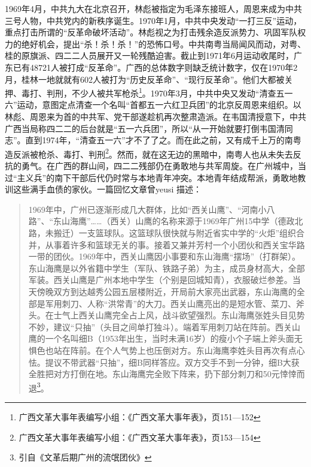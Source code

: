 1969年4月，中共九大在北京召开，林彪被指定为毛泽东接班人，周恩来成为中共三号人物，中共党内的新秩序诞生。1970年1月，中共中央发动“一打三反”运动，重点打击所谓的“反革命破坏活动”。林彪视之为打击残余造反派势力、巩固军队权力的绝好机会，提出“杀！杀！杀！”的恐怖口号。中共南粤当局闻风而动，对粤、桂的原旗派、四二二人员展开又一轮残酷迫害。截止到1971年6月运动收尾时，广东已有48721人被打成“反革命”。广西的总体数字则缺乏统计数字，仅在1970年2月，桂林一地就就有602人被打为“历史反革命”、“现行反革命”。他们大都被关押、毒打、判刑，不少人被共军枪杀\footnote{广西文革大事年表编写小组：《广西文革大事年表》，页151—152}。1970年3月，中共中央又发动“清查五一六”运动，意图定点清查一个名叫“首都五一六红卫兵团”的北京反周恩来组织。以林彪、周恩来为首的中共军、党干部遂趁机再次整肃造派。在韦国清授意下，中共广西当局称四二二的后台就是“五一六兵团”，所以“从一开始就要打倒韦国清同志”。直到1974年，“清查五一六”才不了了之。而在此之前，又有成千上万的南粤造反派被枪杀、毒打、判刑\footnote{广西文革大事年表编写小组：《广西文革大事年表》，页153—154}。然而，就在这无边的黑暗中，南粤人也从未失去反抗的勇气。在广西的群山间，四二二残部仍在勇敢地与共军周旋。在广州城中，当过“主义兵”的南下干部后代仍时常与本地青年冲突。本地青年结成帮派，勇敢地教训这些满手血债的家伙。一篇回忆文章曾yeusi 描述：

\begin{quote}

1969年中，广州已逐渐形成几大群体，比如“西关山鹰”、“河南小八路”、“东山海鹰”……（西关）山鹰的名称来源于1969年广州15中学（德政北路，未搬迁）一支篮球队。这篮球队很快就与附近省实中学的“火炬”组织合并，从事着许多和篮球无关的事。接着又兼并芳村一个小团伙和西关宝华路一带的团伙。1969年中，西关山鹰因小事要和东山海鹰“摆场”（打群架）。东山海鹰是以外省籍中学生（军队、铁路子弟）为主，成员身材高大，全部军装。西关山鹰是广州本地中学生（个别是回城知青），衣服破烂参差。当天傍晚双方到达越秀公园五层楼附近，开局前大家亮出武器，东山海鹰的全部是军用刺刀、人称“洪常青”的大刀。西关山鹰亮出的是短水管、菜刀、斧头。在士气上西关山鹰完全占上风，战斗欲望强烈。东山海鹰张姓头目见势不妙，建议“只抽”（头目之间单打独斗）。端着军用刺刀站在阵前。西关山鹰的一个名叫细B（1953年出生，当时未满16岁）的瘦小个子端上斧头面无惧色也站在阵前。在个人气势上也压倒对方。东山海鹰李姓头目再次有点心怯。提议不带武器“只抽”，细B同样答应。双方交手不到一分钟，细B大获全胜把对方打倒在地。东山海鹰完全败下阵来，扔下部分刺刀和50元悻悻而退\footnote{引自《文革后期广州的流氓团伙》}。

\end{quote}
	
